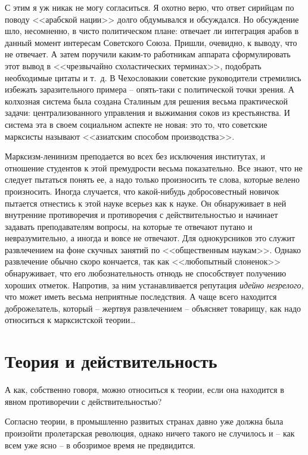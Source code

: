 \documentclass{book}
\begin{document}
С этим я уж никак не могу согласиться. Я охотно верю, что ответ сирийцам по поводу <<арабской нации>> долго обду­мывался и 
обсуждался. Но обсуждение шло, несомненно, в чи­сто политическом плане: отвечает ли интеграция арабов в дан­ный момент интересам 
Советского Союза. Пришли, очевидно, к выводу, что не отвечает. А затем поручили каким-то работ­никам аппарата сформулировать этот 
вывод в <<чрезвычайно схоластических терминах>>, подобрать необходимые цитаты и т.~д. В Чехословакии советские руководители 
стремились из­бежать заразительного примера -- опять-таки с политической точки зрения. А колхозная система была создана Сталиным 
для решения весьма практической задачи: централизованного управления и выжимания соков из крестьянства. И система эта в своем 
социальном аспекте не новая: это то, что совет­ские марксисты называют <<азиатским способом производства>>.

Марксизм-ленинизм преподается во всех без исключения институтах, и отношение студентов к этой премудрости весь­ма показательно. Все знают, что не следует пытаться понять ее, а надо только произносить те слова, которые велено произ­носить. Иногда случается, что какой-нибудь добросовестный новичок пытается отнестись к этой науке всерьез как к науке. Он обнаруживает в ней внутренние противоречия и противо­речия с действительностью и начинает задавать преподавате­лям вопросы, на которые те отвечают путано и невразумитель­но, а иногда и вовсе не отвечают. Для однокурсников это слу­жит развлечением на фоне скучных занятий по <<общественным наукам>>. Однако развлечение обычно скоро кончается, так как <<любопытный слоненок>> обнаруживает, что его любозна­тельность отнюдь не способствует получению хороших отметок. Напротив, за ним устанавливается репутация \textit{идейно незрелого,} что может иметь весьма неприятные последствия. А чаще всего находится доброжелатель, который -- жертвуя развлечением -- объясняет 
товарищу, 
как надо относиться к марксистской теории\ldots


\section{Теория и действительность}

А как, собственно говоря, можно относиться к теории, если она находится в явном противоречии с действительностью?

Согласно теории, в промышленно развитых странах давно уже должна была произойти пролетарская революция, однако ничего такого не 
случилось и -- как всем уже ясно -- в обозримое время не предвидится.
\end{document}
